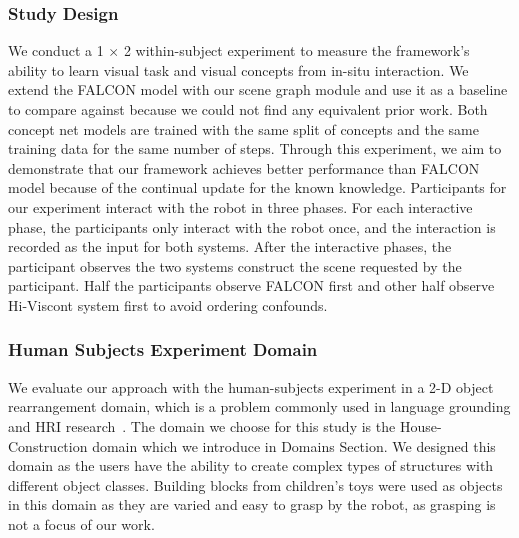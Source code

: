 \subsubsection{Study Design}
We conduct a 1 $\times$ 2 within-subject experiment to measure the framework's ability to learn visual task and visual concepts from in-situ interaction.
We extend the FALCON model with our scene graph module and use it as a baseline to compare against because we could not find any equivalent prior work.
Both concept net models are trained with the same split of concepts and the same training data for the same number of steps.
Through this experiment, we aim to demonstrate that our framework achieves better performance than FALCON model because of the continual update for the known knowledge.
Participants for our experiment interact with the robot in three phases.
For each interactive phase, the participants only interact with the robot once, and the interaction is recorded as the input for both systems.
After the interactive phases, the participant observes the two systems construct the scene requested by the participant. Half the participants observe FALCON first and other half observe Hi-Viscont system first to avoid ordering confounds.

\subsubsection{Human Subjects Experiment Domain}
We evaluate our approach with the human-subjects experiment in a 2-D object rearrangement domain, which is a problem commonly used in language grounding and HRI research~\citep{liu2021structformer, shridhar2021cliport}.
The domain we choose for this study is the House-Construction domain which we introduce in Domains Section. We designed this domain as the users have the ability to create complex types of structures with different object classes.
Building blocks from children's toys were used as objects in this domain as they are varied and easy to grasp by the robot, as grasping is not a focus of our work.

